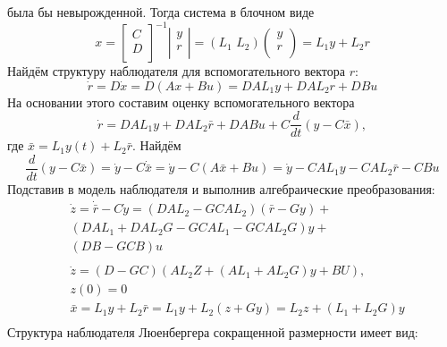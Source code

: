 \documentclass[preprint,russian,a5paper,10pt,twoside,mediummath]{ncc}
\begin{document}
была бы невырожденной. Тогда система в блочном виде \[x={{\left[ \begin{matrix}
   C  \\
   D  \\
\end{matrix} \right]}^{-1}}\left| \begin{matrix}
   y  \\
   r  \\
\end{matrix} \right|=\left( {{L}_{1}}\,\,{{L}_{2}} \right)\left( \begin{matrix}
   y  \\
   r  \\
\end{matrix} \right)={{L}_{1}}y+{{L}_{2}}r\]
Найдём структуру наблюдателя для вспомогательного вектора $r$: 
\[\dot{r}=D\dot{x}=D(Ax+Bu)=DA{{L}_{1}}y+DA{{L}_{2}}r+DBu\]
На основании этого составим оценку вспомогательного вектора 
\[\dot{r}=DA{{L}_{1}}y+DA{{L}_{2}}\bar{r}+DABu+C\frac{d}{dt}(y-C\bar{x}),\] где $\bar{x}={{L}_{1}}y(t)+{{L}_{2}}\bar{r}$. Найдём 
\[\frac{d}{dt}(y-C\bar{x})=\dot{y}-C\dot{\bar{x}}=\dot{y}-C(A\bar{x}+Bu)=\dot{y}-CA{{L}_{1}}y-CA{{L}_{2}}\bar{r}-CBu\] 
Подставив в модель наблюдателя и выполнив алгебраические преобразования: 
\[\begin{array}{*{35}{l}}
   {} & \dot{z}=\dot{\bar{r}}-C\dot{y}=(DA{{L}_{2}}-GCA{{L}_{2}})(\bar{r}-Gy)+\\
   {} & (DA{{L}_{1}}+DA{{L}_{2}}G-GCA{{L}_{1}}-GCA{{L}_{2}}G)y+\\
   {} & (DB-GCB)u\\
	\\   
   {} & \dot{z}=(D-GC)(A{{L}_{2}}Z+(A{{L}_{1}}+A{{L}_{2}}G)y+BU),  \\
   {} & z(0)=0\\
   {} & \bar{x}={{L}_{1}}y+{{L}_{2}}\bar{r}={{L}_{1}}y+{{L}_{2}}(z+Gy)={{L}_{2}}z+({{L}_{1}}+{{L}_{2}}G)y  \\
\end{array}\]
Структура наблюдателя Люенбергера сокращенной размерности имеет вид:
\end{document}
